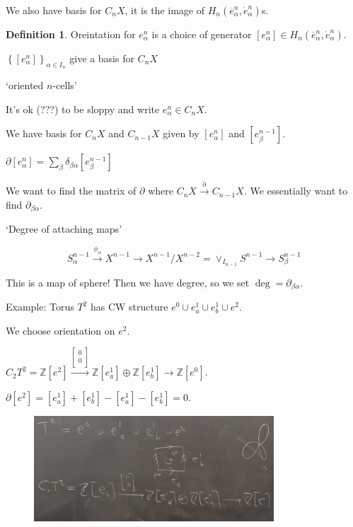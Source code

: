 \documentclass{article}
\theoremstyle{definition}
\newtheorem*{definition}{Definition}
\begin{document}
    We also have basis for \(C_n X\), it is the image of \(H_n(\overline{e}^n_\alpha, \dot{e}^n_\alpha)\)s.

    \begin{definition}
        Oreintation for \(e^n_\alpha\) is a choice of generator \([e^n_\alpha] \in H_n(\overline{e}^n_\alpha , \dot{e}^n_\alpha)\).
        
        \(\left\{ \left[ e^n_\alpha \right]  \right\}_{\alpha \in I_n}\) give a basis for \(C_n X\)
        
        `oriented \(n\)-cells'

        It's ok (???) to be sloppy and write \(e^n_{\alpha }\in C_n X\).
    \end{definition}

    We have basis for \(C_n X\) and \(C_{n-1} X\) given by \([e_\alpha^n]\) and \([e^{n-1}_\beta]\).
    
    \(\partial [e^n_\alpha] = \sum_{\beta} \delta_{\beta \alpha} [e_\beta^{n-1}]\)

    We want to find the matrix of \(\partial\) where \(C_n X \xrightarrow{\partial} C_{n-1} X\). We essentially want to find \(\partial_{\beta \alpha}\).
    
    `Degree of attaching maps'

    \[
        S_\alpha^{n-1} \xrightarrow{\phi_\alpha} X^{n-1} \to X^{n-1} / X^{n-2} = \vee_{I_{n-1}} S^{n-1} \to S_\beta^{n-1}
    \]

    This is a map of sphere! Then we have degree, so we set \(\deg = \partial_{\beta \alpha}\).

    Example: Torus \(T^2\) has CW structure \(e^0 \cup e^1_a \cup e^1_b \cup e^2\).

    We choose orientation on \(e^2\). 

    \(C_2 T^2 = \mathbb{Z}[e^2] \xrightarrow{\begin{bmatrix}
        0 \\
        0 \\
    \end{bmatrix}} \mathbb{Z}[e^{1}_a]\oplus \mathbb{Z}[e^1_b] \to \mathbb{Z}[e^0]\).
    
    \(\partial[e^2] = [e^1_a] + [e^1_b] - [e^1_a] - [e^1_b] = 0\).

    \begin{figure}[H]
        \centering
        \includegraphics[width=0.8\textwidth]{img/toruscell.jpg}
        \caption{}
    \end{figure}
\end{document}
